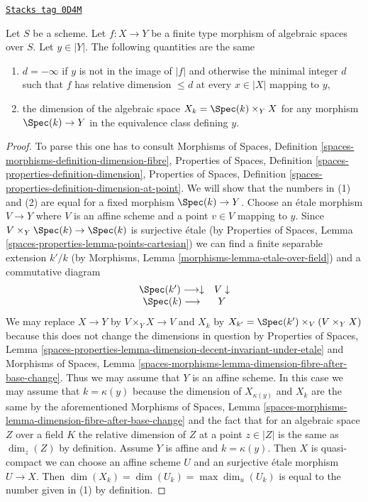 \begin{lemma}
\label{spaces-more-morphisms-lemma-dimension-fibre}
\href{https://stacks.math.columbia.edu/tag/0D4M}{\texttt{Stacks tag 0D4M}}

Let $S$ be a scheme. Let $f : X \to Y$ be a finite type morphism of
algebraic spaces over $S$. Let $y \in |Y|$. The following quantities
are the same
\begin{enumerate}
\item $d = -\infty$ if $y$ is not in the image of $|f|$ and
otherwise the minimal integer $d$ such that $f$ has relative dimension $\leq d$
at every $x \in |X|$ mapping to $y$,
\item the dimension of the algebraic space $X_k = \Spec(k) \times_Y X$
for any morphism $\Spec(k) \to Y$ in the equivalence class defining $y$.
\end{enumerate}
\end{lemma}

\begin{proof}
To parse this one has to consult
Morphisms of Spaces, Definition
\ref{spaces-morphisms-definition-dimension-fibre},
Properties of Spaces,
Definition \ref{spaces-properties-definition-dimension},
Properties of Spaces,
Definition \ref{spaces-properties-definition-dimension-at-point}.
We will show that the numbers in (1) and (2) are equal for
a fixed morphism $\Spec(k) \to Y$.
Choose an \'etale morphism $V \to Y$ where $V$ is an affine
scheme and a point $v \in V$ mapping to $y$.
Since $V \times_Y \Spec(k) \to \Spec(k)$ is surjective \'etale
(by Properties of Spaces, Lemma \ref{spaces-properties-lemma-points-cartesian})
we can find a finite separable extension $k'/k$
(by Morphisms, Lemma \ref{morphisms-lemma-etale-over-field})
and a commutative diagram
$$
\begin{array}{cc}\Spec(k') \longrightarrow\downarrow & V \downarrow \\ \Spec(k) \longrightarrow & Y\end{array}
$$
We may replace $X \to Y$ by $V \times_Y X \to V$ and
$X_k$ by $X_{k'} = \Spec(k') \times_V (V \times_Y X)$
because this does not change the dimensions in question by
Properties of Spaces, Lemma
\ref{spaces-properties-lemma-dimension-decent-invariant-under-etale}
and Morphisms of Spaces, Lemma
\ref{spaces-morphisms-lemma-dimension-fibre-after-base-change}.
Thus we may assume that $Y$ is an affine scheme.
In this case we may assume that $k = \kappa(y)$
because the dimension of $X_{\kappa(y)}$ and $X_k$
are the same by the aforementioned Morphisms of Spaces, Lemma
\ref{spaces-morphisms-lemma-dimension-fibre-after-base-change}
and the fact that for an algebraic space $Z$ over a field $K$ the
relative dimension of $Z$ at a point $z \in |Z|$
is the same as $\dim_z(Z)$ by definition.
Assume $Y$ is affine and $k = \kappa(y)$. Then
$X$ is quasi-compact we can choose an affine scheme $U$ and
an surjective \'etale morphism $U \to X$.
Then $\dim(X_k) = \dim(U_k) = \max \dim_u(U_k)$
is equal to the number given in (1) by definition.
\end{proof}


